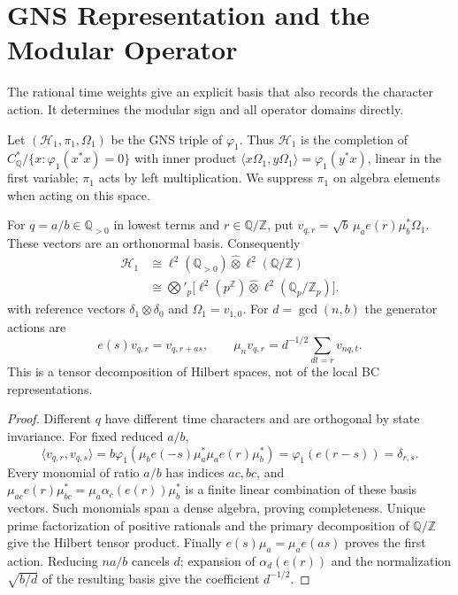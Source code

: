 \section{GNS Representation and the Modular Operator}
\label{v4-arith:w5-b:gns-modular}

The rational time weights give an explicit basis that also records
the character action. It determines the modular sign and all
operator domains directly.

\begin{definition}
\label{v4-arith:w5-b:def:gns}
Let $(\mathcal H_1,\pi_1,\Omega_1)$ be the GNS triple of $\varphi_1$.
Thus $\mathcal H_1$ is the completion of
$C^*_{\mathbb Q}/\{x:\varphi_1(x^*x)=0\}$ with inner product
$\langle x\Omega_1,y\Omega_1\rangle=\varphi_1(y^*x)$,
linear in the first variable; $\pi_1$ acts by left multiplication.
We suppress $\pi_1$ on algebra elements when acting on this space.
\end{definition}

\begin{lemma}
\label{v4-arith:w5-b:lem:gns-restricted-tensor}
For $q=a/b\in\mathbb Q_{>0}$ in lowest terms and $r\in\mathbb Q/\mathbb Z$,
put $v_{q,r}=\sqrt b\,\mu_a e(r)\mu_b^*\Omega_1$. These vectors are
an orthonormal basis. Consequently
\[
 \begin{aligned}
 \mathcal H_1&\cong\ell^2(\mathbb Q_{>0})\widehat\otimes
 \ell^2(\mathbb Q/\mathbb Z)\\
 &\cong\bigotimes'_p\bigl[\ell^2(p^{\mathbb Z})\widehat\otimes
 \ell^2(\mathbb Q_p/\mathbb Z_p)\bigr].
 \end{aligned}
\]
with reference vectors $\delta_1\otimes\delta_0$ and
$\Omega_1=v_{1,0}$. For $d=\gcd(n,b)$ the generator actions are
\[
 e(s)v_{q,r}=v_{q,r+as},\qquad
 \mu_n v_{q,r}=d^{-1/2}\sum_{dt=r}v_{nq,t}.
\]
This is a tensor decomposition of Hilbert spaces, not of the local
BC representations.
\end{lemma}
\begin{proof}
Different $q$ have different time characters and are orthogonal by
state invariance. For fixed reduced $a/b$,
\[
 \langle v_{q,r},v_{q,s}\rangle
 =b\varphi_1(\mu_b e(-s)\mu_a^*\mu_a e(r)\mu_b^*)
 =\varphi_1(e(r-s))=\delta_{r,s}.
\]
Every monomial of ratio $a/b$ has indices $ac,bc$, and
$\mu_{ac}e(r)\mu_{bc}^*=\mu_a\alpha_c(e(r))\mu_b^*$ is a finite
linear combination of these basis vectors. Such monomials span a
dense algebra, proving completeness. Unique prime factorization of
positive rationals and the primary decomposition of $\mathbb Q/\mathbb Z$
give the Hilbert tensor product. Finally
$e(s)\mu_a=\mu_a e(as)$ proves the first action. Reducing $na/b$
cancels $d$; expansion of $\alpha_d(e(r))$ and the normalization
$\sqrt{b/d}$ of the resulting basis give the coefficient $d^{-1/2}$.
\end{proof}

